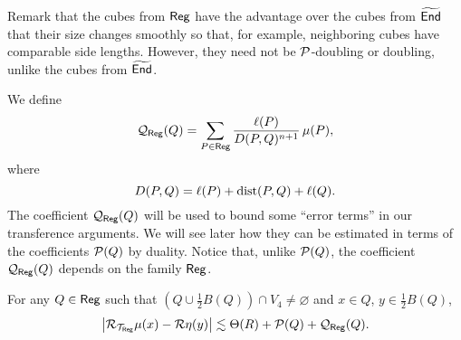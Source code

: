 Remark that the cubes from ${\mathsf{Reg}}$ have the advantage over the cubes from ${\widetilde{{\mathsf{End}}}}$ that their size changes smoothly so that, for example, neighboring cubes have comparable side lengths. However, they need not be ${\mathcal P}$-doubling or doubling, unlike the cubes from ${\widetilde{{\mathsf{End}}}}$. 

We define
$${\mathcal Q}_{\mathsf{Reg}}(Q) = \sum_{P\in{\mathsf{Reg}}} \frac{\ell(P)}{D(P,Q)^{n+1}}\,\mu(P),$$
where 
$$D(P,Q) = \ell(P) + {\rm dist}(P,Q) + \ell(Q).$$
The coefficient ${\mathcal Q}_{\mathsf{Reg}}(Q)$ will be used to bound some ``error terms'' in our transference 
arguments. We will see later how they can be estimated in terms of the coefficients ${\mathcal P}(Q)$ by duality. Notice that, unlike ${\mathcal P}(Q)$, the coefficient ${\mathcal Q}_{\mathsf{Reg}}(Q)$ depends on the family
${\mathsf{Reg}}$.

\vv


\begin{lemma}\label{lemaprox1}
For any $Q\in{\mathsf{Reg}}$ such that $(Q\cup \frac12 B(Q))\cap V_4\neq\varnothing$ and $x\in Q$, $y\in \frac12B(Q)$,
$$\big|{\mathcal R}_{{\mathcal T}_{\mathsf{Reg}}}\mu(x) - {\mathcal R}\eta(y)\big| \lesssim \Theta(R) + {\mathcal P}(Q) + {\mathcal Q}_{\mathsf{Reg}}(Q).$$
\end{lemma}

